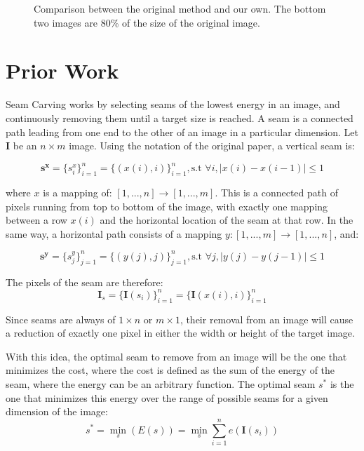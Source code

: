 \documentclass[10pt,twocolumn,letterpaper]{article}
\begin{document}
\begin{figure}[t]
  \caption{Comparison between the original method and our own. The bottom two
    images are 80\% of the size of the original image.}
  \label{fig:laughcomparison}
\end{figure}

\section{Prior Work}

Seam Carving \cite{seamcarve} works by selecting seams of the lowest energy in
an image, and continuously removing them until a target size is reached. A seam
is a connected path leading from one end to the other of an image in a
particular dimension. Let $\boldsymbol{I}$ be an $n \times m$ image. Using the notation of
the original paper, a vertical seam is:

\begin{equation}
  \boldsymbol{s^x} = \{s_i^x\}_{i=1}^n = \{(x(i),i)\}_{i=1}^n, \text{s.t } \forall{i}, |x(i) - x(i-1)| \leq 1
\end{equation}

where $x$ is a mapping of: $[1,...,n] \rightarrow [1,...,m]$. This is a
connected path of pixels running from top to bottom of the image, with exactly
one mapping between a row $x(i)$ and the horizontal location of the seam at that
row. In the same way, a horizontal path consists of a mapping $y: [1,...,m]
\rightarrow [1,...,n]$, and:

\begin{equation}
  \boldsymbol{s^y} = \{s_j^y\}_{j=1}^n = \{(y(j),j)\}_{j=1}^n, \text{s.t } \forall{j}, |y(j) - y(j-1)| \leq 1
\end{equation}

The pixels of the seam are therefore:
\begin{equation}
  \boldsymbol{I}_s = \{\boldsymbol{I}(s_i)\}_{i=1}^n = \{\boldsymbol{I}(x(i),i)\}_{i=1}^n
\end{equation}

Since seams are always of $1 \times n$ or $m \times 1$, their removal from an
image will cause a reduction of exactly one pixel in either the width or height
of the target image.

With this idea, the optimal seam to remove from an image will be the one that
minimizes the cost, where the cost is defined as the sum of the energy of the
seam, where the energy can be an arbitrary function. The optimal seam $s^*$ is
the one that minimizes this energy over the range of possible seams for a given
dimension of the image:
\begin{equation}
  s^* = \min_s(E(s)) = \min_s \sum_{i=1}^n{e(\boldsymbol{I}(s_i))}
\end{equation}
\end{document}
